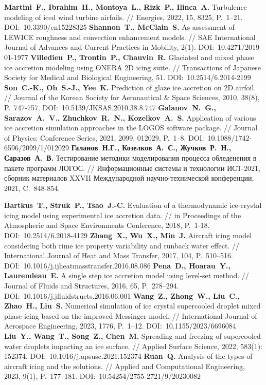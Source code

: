 \begin{thebibliography}{99}
\textbf{Martini~F., Ibrahim~H., Montoya~L., Rizk~P., Ilinca~A.} Turbulence modeling of iced wind turbine airfoils. // Energies, 2022, 15, 8325, P.~1–21. DOI:~10.3390/en15228325
\textbf{Shannon~T., McClain~S.} As assessment of LEWICE roughness and convection enhancement models. // SAE International Journal of Advances and Current Practices in Mobility, 2(1). DOI:~10.4271/2019-01-1977
\textbf{Villedieu~P., Trontin~P., Chauvin~R.} Glaciated and mixed phase ice accretion modeling using ONERA 2D icing suite. // Transactions of Japanese Society for Medical and Biological Engineering, 51. DOI:~10.2514/6.2014-2199
\textbf{Son~C.-K., Oh~S.-J., Yee~K.} Prediction of glaze ice accretion on 2D airfoil. // Journal of the Korean Society for Aeronautical \& Space Sciences, 2010, 38(8), P.~747-757. DOI:~10.5139/JKSAS.2010.38.8.747
\textbf{Galanov~N.~G., Sarazov~A.~V., Zhuchkov~R.~N., Kozelkov~A.~S.} Application of various ice accretion simulation approaches in the LOGOS software package. // Journal of Physics: Conference Series, 2021, 2099, 012029, P.~1–8. DOI:~10.1088/1742-6596/2099/1/012029
\textbf{Галанов~Н.Г., Козелков~А.~С., Жучков~Р.~Н., Саразов~А.~В.} Тестирование методики моделирования процесса обледенения в пакете программ ЛОГОС. // Информационные системы и технологии ИСТ-2021, сборник материалов XXVII Международной научно-технической конференции, 2021, C.~848-854.

\textbf{Bartkus~T., Struk~P., Tsao~J.-C.} Evaluation of a thermodynamic ice-crystal icing model using experimental ice accretion data. // in Proceedings of the Atmospheric and Space Environments Conference, 2018, P.~1-18. DOI:~10.2514/6.2018-4129
\textbf{Zhang~X., Wu~X., Min~J.} Aircraft icing model considering both rime ice property variability and runback water effect. // International Journal of Heat and Mass Transfer, 2017, 104, P.~510–516. DOI:~10.1016/j.ijheatmasstransfer.2016.08.086
\textbf{Pena~D., Hoarau~Y., Laurendeau~E.} A single step ice accretion model using level-set method. // Journal of Fluids and Structures, 2016, 65, P.~278–294. DOI:~10.1016/j.jfluidstructs.2016.06.001
\textbf{Wang~Z., Zhong~W., Liu~C., Zhao~H., Liu~S.} Numerical simulation of ice crystal supercooled droplet mixed phase icing based on the improved Messinger model. // International Journal of Aerospace Engineering, 2023, 1776, P.~1–12. DOI:~10.1155/2023/6696084
\textbf{Liu~Y., Wang~T., Song~Z., Chen~M.} Spreading and freezing of supercooled water droplets impacting an ice surface. // Applied Surface Science, 2022, 583(1): 152374. DOI:~10.1016/j.apsusc.2021.152374
\textbf{Ruan~Q.} Analysis of the types of aircraft icing and the solutions. // Applied and Computational Engineering, 2023, 9(1), P.~177–181. DOI:~10.54254/2755-2721/9/20230082


\end{thebibliography}
